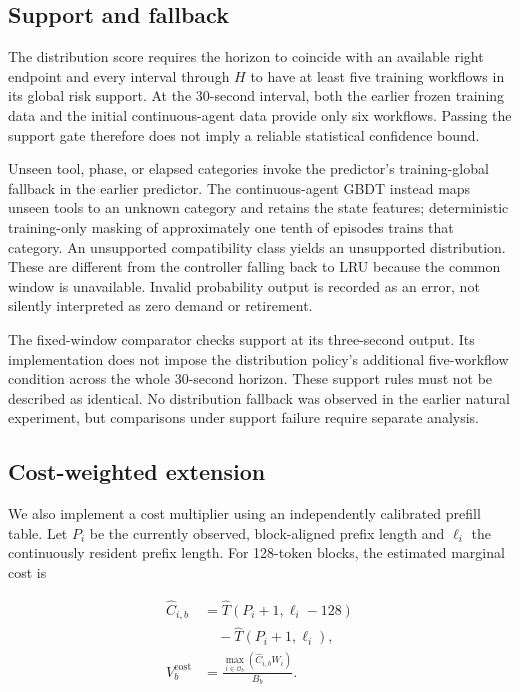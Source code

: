 \documentclass[sigconf, screen, review, balance=false]{acmart}
\begin{document}
\subsection{Support and fallback}\label{support-and-fallback}

The distribution score requires the horizon to coincide with an
available right endpoint and every interval through \(H\) to have at
least five training workflows in its global risk support. At the
30-second interval, both the earlier frozen training data and the
initial continuous-agent data provide only six workflows.
Passing the support gate therefore does not imply a reliable statistical
confidence bound.

Unseen tool, phase, or elapsed categories invoke the predictor's
training-global fallback in the earlier predictor. The continuous-agent
GBDT instead maps unseen tools to an unknown category and retains the
state features; deterministic training-only masking of approximately
one tenth of episodes trains that category. An unsupported compatibility
class yields an unsupported distribution. These are different from the controller
falling back to LRU because the common window is unavailable. Invalid
probability output is recorded as an error, not silently interpreted as
zero demand or retirement.

The fixed-window comparator checks support at its three-second output.
Its implementation does not impose the distribution policy's additional
five-workflow condition across the whole 30-second horizon. These
support rules must not be described as identical. No distribution
fallback was observed in the earlier natural experiment, but
comparisons under support failure require separate analysis.

\subsection{Cost-weighted extension}\label{cost-weighted-extension}

We also implement a cost multiplier using an independently calibrated
prefill table. Let \(P_i\) be the currently observed, block-aligned
prefix length and \(\ell_i\) the continuously resident prefix length.
For 128-token blocks, the estimated marginal cost is

\[
\begin{aligned}
\widehat C_{i,b}&=\widehat T(P_i+1,\ell_i-128)\\
 &\quad-\widehat T(P_i+1,\ell_i),\\
V_b^{\mathrm{cost}}&=\frac{\max_{i\in\mathcal O_b}
 (\widehat C_{i,b}W_i)}{B_b}.
\end{aligned}
\]
\end{document}
